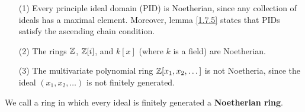 \begin{example}\label{example_1.6}
    \begin{enumerate}
        \item[(1)] Every principle ideal domain (PID) is Noetherian, since any
            collection of ideals has a maximal element. Moreover, lemma
            \ref{1.7.5} states that PIDs satisfy the ascending chain condition.

        \item[(2)] The rings $\mathbb{Z}$, $\mathbb{Z}[i]$, and $k[x]$ (where $k$ is a field)
            are Noetherian.

        \item[(3)] The multivariate polynomial ring $\mathbb{Z}[x_1, x_2, \dots]$ is not
            Noetheria, since the ideal $(x_1, x_2, \dots)$ is not finitely
            generated.
    \end{enumerate}
\end{example}

\begin{definition}
    We call a ring in which every ideal is finitely generated a
    \textbf{Noetherian ring}.
\end{definition}

